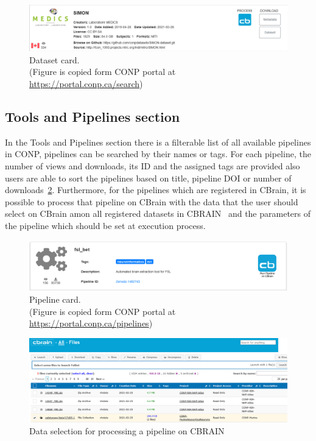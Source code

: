\begin{figure}[ht]
  \centering
  \includegraphics[width=\textwidth]{figures/dataCard.png}
  \caption{Dataset card. \\(Figure is copied form CONP portal at \url{https://portal.conp.ca/search})}
  \label{fig:data_card}
\end{figure} 


\subsection{Tools and Pipelines section}
In the Tools and Pipelines section there is a filterable list of all available pipelines in CONP,
pipelines can be searched by their names or tags. For each pipeline, the number of views and downloads, its ID and the assigned tags are provided also users are able to sort the pipelines based on title, pipeline DOI or number of downloads~\ref{fig:pipeline_card}. Furthermore, for the pipelines which are registered in CBrain, it is possible to process that pipeline on CBrain with the data that the user should select on CBrain amon all registered datasets in CBRAIN~\cite{sherif2014cbrain} and the parameters of the pipeline which should be set at execution process. 
\begin{figure}[ht]
  \centering
  \includegraphics[width=\textwidth]{figures/pipelinecard.png}
  \caption{Pipeline card. \\(Figure is copied form CONP portal at \url{https://portal.conp.ca/pipelines})}
  \label{fig:pipeline_card}
\end{figure} 

\begin{figure}[ht]
  \centering
  \includegraphics[width=\textwidth]{figures/CBRAIN.png}
  \caption{Data selection for processing a pipeline on CBRAIN }
  \label{fig:cbrainDataSelection}
\end{figure} 

